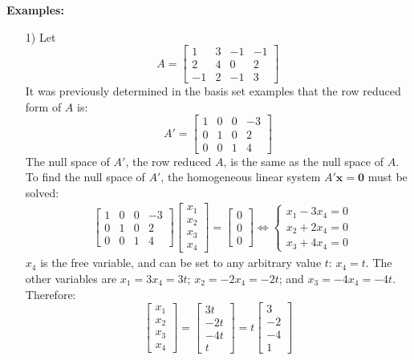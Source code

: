 \documentclass{article}
\begin{document}
\textbf{Examples:}
\begin{itemize}
\item[1)] Let \[A = \begin{bmatrix}
  1 & 3 &  -1 &  -1 \\
  2 & 4 &   0 &   2 \\
-1 &  2 & -1 &   3 
\end{bmatrix}\]
It was previously determined in the basis set examples that the row reduced form of \(A\) is:
\[A' = \begin{bmatrix}
1 & 0 & 0 & -3 \\
0 & 1 & 0 &  2 \\
0 & 0 & 1 &  4 
\end{bmatrix}\]
The null space of \(A'\), the row reduced \(A\), is the same as the null space of \(A\). To find the null space of \(A'\), the homogeneous linear system \(A'\mathbf{x} = \mathbf{0}\) must be solved:
\begin{align*}
& \begin{bmatrix}
1 & 0 & 0 & -3 \\
0 & 1 & 0 &  2 \\
0 & 0 & 1 &  4 
\end{bmatrix}\begin{bmatrix} x_1 \\ x_2 \\ x_3 \\ x_4 \end{bmatrix} = \begin{bmatrix} 0 \\ 0 \\ 0 \end{bmatrix} 
\iff \left\{\begin{array}{c} 
x_1 - 3x_4 = 0 \\ 
x_2 + 2x_4 = 0 \\ 
x_3 + 4x_4 = 0
\end{array}\right.
\end{align*} 
\(x_4\) is the free variable, and can be set to any arbitrary value \(t\): \(x_4 = t\). The other variables are \(x_1 = 3x_4 = 3t\); \(x_2 = -2x_4 = -2t\); and \(x_3 = -4x_4 = -4t\). Therefore:
\[\begin{bmatrix} x_1 \\ x_2 \\ x_3 \\ x_4 \end{bmatrix} = \begin{bmatrix} 3t \\ -2t \\ -4t \\ t \end{bmatrix} = t \begin{bmatrix} 3 \\ -2 \\ -4 \\ 1\end{bmatrix}\]  

\end{itemize}
\end{document}
